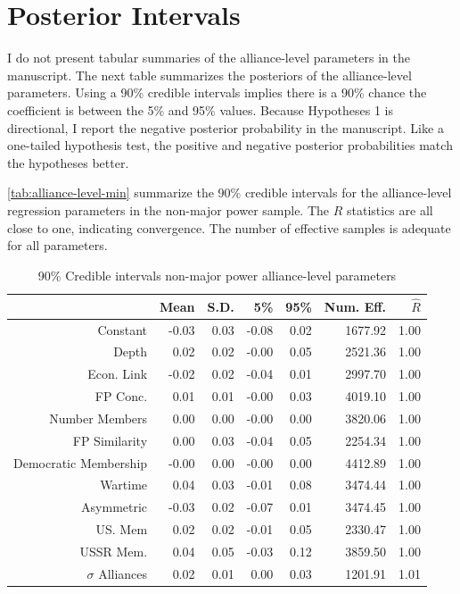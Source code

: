 \documentclass[12pt]{article}
\begin{document}
\section{Posterior Intervals} 


I do not present tabular summaries of the alliance-level parameters in the manuscript. 
The next table summarizes the posteriors of the alliance-level parameters. 
Using a 90\% credible intervals implies there is a 90\% chance the coefficient is between the 5\% and 95\% values. 
Because Hypotheses 1 is directional, I report the negative posterior probability in the manuscript.  
Like a one-tailed hypothesis test, the positive and negative posterior probabilities match the hypotheses better. 


\autoref{tab:alliance-level-min} summarize the 90\% credible intervals for the alliance-level regression parameters in the non-major power sample. 
The $\hat{R}$ statistics are all close to one, indicating convergence. 
The number of effective samples is adequate for all parameters.

\begin{table}[ht]
\centering
\begin{tabular}{rrrrrrr}
  \hline
 & Mean & S.D. & 5\% & 95\% & Num. Eff. & $\hat{R}$ \\ 
  \hline
Constant & -0.03 & 0.03 & -0.08 & 0.02 & 1677.92 & 1.00 \\ 
  Depth & 0.02 & 0.02 & -0.00 & 0.05 & 2521.36 & 1.00 \\ 
  Econ. Link & -0.02 & 0.02 & -0.04 & 0.01 & 2997.70 & 1.00 \\ 
  FP Conc. & 0.01 & 0.01 & -0.00 & 0.03 & 4019.10 & 1.00 \\ 
  Number Members & 0.00 & 0.00 & -0.00 & 0.00 & 3820.06 & 1.00 \\ 
  FP Similarity & 0.00 & 0.03 & -0.04 & 0.05 & 2254.34 & 1.00 \\ 
  Democratic Membership & -0.00 & 0.00 & -0.00 & 0.00 & 4412.89 & 1.00 \\ 
  Wartime & 0.04 & 0.03 & -0.01 & 0.08 & 3474.44 & 1.00 \\ 
  Asymmetric & -0.03 & 0.02 & -0.07 & 0.01 & 3474.45 & 1.00 \\ 
  US. Mem & 0.02 & 0.02 & -0.01 & 0.05 & 2330.47 & 1.00 \\ 
  USSR Mem. & 0.04 & 0.05 & -0.03 & 0.12 & 3859.50 & 1.00 \\ 
  $\sigma$ Alliances & 0.02 & 0.01 & 0.00 & 0.03 & 1201.91 & 1.01 \\ 
   \hline
\end{tabular}
\caption{90\% Credible intervals non-major power alliance-level parameters}
\label{tab:alliance-level-min}
\end{table}
\end{document}
